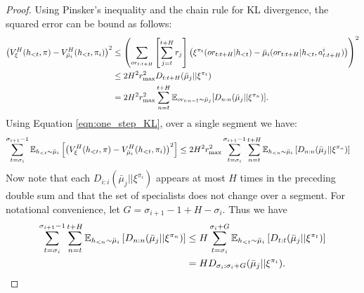 \begin{proof}
        Using Pinsker's inequality and the chain rule for KL divergence, the squared error can be bound as follows:
        \begin{align}
            \left( V_{\xi}^{H}(h_{<t}, \pi) - V_{\bar{\mu}_i}^{H}(h_{<t}, \pi_i) \right)^2 &\leq \left( \sum_{or_{t:t+H}} \left[ \sum_{j=t}^{t+H} r_j \right] \left(\xi^{\pi_t}(or_{t:t+H} | h_{<t}) - \bar{\mu}_i(or_{t:t+H} | h_{<t}, a^{i}_{t:t+H}) \right) \right)^2 \nonumber \\
            &\leq 2 H^2 r_{\max}^2 D_{t:t+H}(\bar{\mu}_j || \xi^{\pi_t}) \nonumber \\
            &= 2 H^2 r_{\max}^2 \sum_{n=t}^{t+H} \mathbb{E}_{or_{t:n-1} \sim \bar{\mu}_j} [D_{n:n}(\bar{\mu}_j || \xi^{\pi_n})]. \label{eqn:one_step_KL}
        \end{align}
        Using Equation \ref{eqn:one_step_KL}, over a single segment we have:
        \begin{align}
            \sum_{t = \sigma_i}^{\sigma_{i+1}-1} \mathbb{E}_{h_{<t} \sim \bar{\mu}_i} \left[ \left( V_{\xi}^{H}(h_{<t}, \pi) - V_{\bar{\mu}_i}^{H}(h_{<t}, \pi_i) \right)^2 \right] &\leq 
            2 H^2 r_{\max}^2 \sum_{t = \sigma_i}^{\sigma_{i+1}-1} \sum_{n=t}^{t+H} \mathbb{E}_{h_{<n} \sim \bar{\mu}_i} \left[ D_{n:n}(\bar{\mu}_j || \xi^{\pi_n}) \right] \label{eqn:double_sum}
        \end{align}
        Now note that each $D_{i:i}(\bar{\mu}_j || \xi^{\pi_i})$ appears at most $H$ times in the preceding double sum and that the set of specialists does not change over a segment. For notational convenience, let $G = \sigma_{i+1}-1 + H - \sigma_i$. Thus we have
        \begin{align}
            \sum_{t = \sigma_i}^{\sigma_{i+1}-1} \sum_{n=t}^{t+H} \mathbb{E}_{h_{<n} \sim \bar{\mu}_i} \left[ D_{n:n}(\bar{\mu}_j || \xi^{\pi_n}) \right] &\leq 
            H \sum_{t=\sigma_i}^{\sigma_{i} + G} \mathbb{E}_{h_{<t} \sim \bar{\mu}_i} \left[ D_{t:t}(\bar{\mu}_j || \xi^{\pi_t}) \right] \nonumber\\
            &= H D_{\sigma_i: \sigma_i + G} (\bar{\mu}_j || \xi^{\pi_i}). \label{eqn:KL_sigma}
        \end{align}
    

\end{proof}
